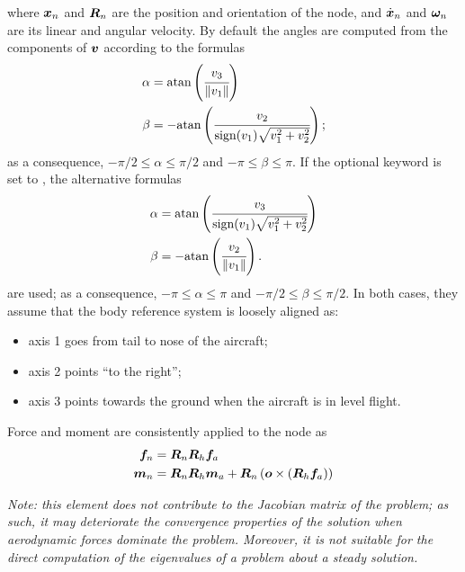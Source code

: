 where $\boldsymbol{x}_n$ and $\boldsymbol{R}_n$ are the position and orientation 
of the node, and $\dot{\boldsymbol{x}}_n$ and $\boldsymbol{\omega}_n$ are its linear
and angular velocity.
By default the angles are computed from the components of $\boldsymbol{v}$
according to the formulas
\begin{subequations}
\begin{align}
	\alpha
	&=
	\text{atan}\left( 
		\cfrac{v_3}{\left\| v_1 \right\|}
	 \right)
	\\
	\beta
	&=
	-\text{atan}\left( 
		\cfrac{v_2}{\text{sign}(v_1)\sqrt{v_1^2 + v_2^2}}
	 \right)
	;
\end{align}
\end{subequations}
as a consequence, $-\pi/2 \le \alpha \le \pi/2$
and $-\pi \le \beta \le \pi$.
If the optional keyword  is set to ,
the alternative formulas
\begin{subequations}
\begin{align}
	\alpha
	&=
	\text{atan}\left( 
		\cfrac{v_3}{\text{sign}(v_1)\sqrt{v_1^2 + v_2^2}}
	 \right)
	\\
	\beta
	&=
	-\text{atan}\left( 
		\cfrac{v_2}{\left\| v_1 \right\|}
	 \right)
	.
\end{align}
\end{subequations}
are used; as a consequence, $-\pi \le \alpha \le \pi$
and $-\pi/2 \le \beta \le \pi/2$.
In both cases, they assume that the body reference system
is loosely aligned as:
\begin{itemize}
\item axis 1 goes from tail to nose of the aircraft;
\item axis 2 points ``to the right'';
\item axis 3 points towards the ground when the aircraft is in level flight.
\end{itemize}
Force and moment are consistently applied to the node as
\begin{subequations}
\begin{align}
	\boldsymbol{f}_n &= \boldsymbol{R}_n \boldsymbol{R}_h \boldsymbol{f}_a
	\\
	\boldsymbol{m}_n &= \boldsymbol{R}_n \boldsymbol{R}_h \boldsymbol{m}_a
		+ \boldsymbol{R}_n \left( \boldsymbol{o} \times \left( \boldsymbol{R}_h \boldsymbol{f}_a \right) \right)
\end{align}
\end{subequations}

\emph{Note: this element does not contribute to the Jacobian matrix
of the problem; as such, it may deteriorate the convergence properties
of the solution when aerodynamic forces dominate the problem.
Moreover, it is not suitable for the direct computation of the eigenvalues
of a problem about a steady solution.}

